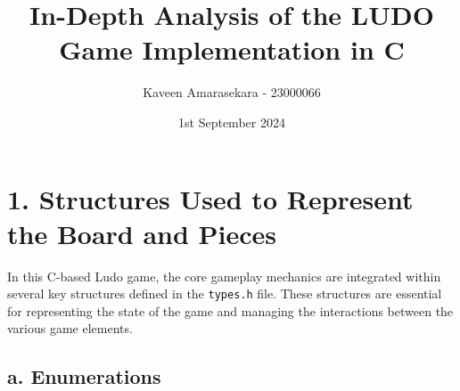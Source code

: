 \documentclass[a4paper,12pt]{article}
\title{In-Depth Analysis of the LUDO Game Implementation in C}
\author{Kaveen Amarasekara - 23000066}
\date{1st September 2024}
\begin{document}
\maketitle

\section*{1. Structures Used to Represent the Board and Pieces}

In this C-based Ludo game, the core gameplay mechanics are integrated within several key structures defined in the \texttt{types.h} file. These structures are essential for representing the state of the game and managing the interactions between the various game elements.

\subsection*{a. Enumerations}
\end{document}
